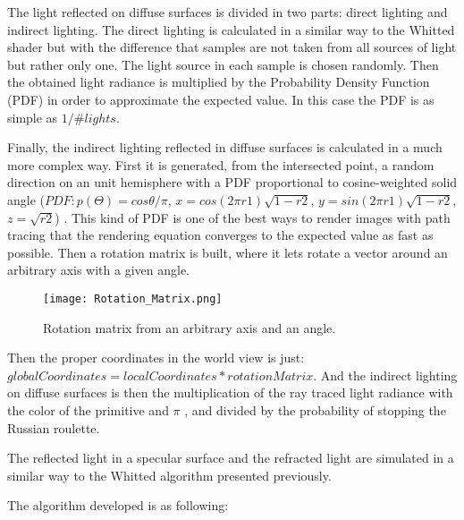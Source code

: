 \par
The light reflected on diffuse surfaces is divided in two parts: direct lighting and indirect lighting.
The direct lighting is calculated in a similar way to the Whitted shader but with the difference that samples are not taken from all sources of light but rather only one.
The light source in each sample is chosen randomly.
Then the obtained light radiance is multiplied by the Probability Density Function (PDF) in order to approximate the expected value.
In this case the PDF is as simple as
$1 / \#lights$.

\par
Finally, the indirect lighting reflected in diffuse surfaces is calculated in a much more complex way.
First it is generated, from the intersected point, a random direction on an unit hemisphere with a PDF proportional to cosine-weighted solid angle
($PDF: p(\Theta) = cos\theta / \pi$,
$x = cos(2\pi r1)\sqrt{1-r2}$,
$y = sin(2\pi r1)\sqrt{1-r2}$,
$z = \sqrt{r2}$)
.
This kind of PDF is one of the best ways to render images with path tracing that the rendering equation converges to the expected value as fast as possible.
Then a rotation matrix is built, where it lets rotate a vector around an arbitrary axis with a given angle.

\begin{figure}[H]
	\centering
	\caption{Rotation matrix from an arbitrary axis and an angle.}
	\label{Rotation_matrix.}
	\texttt{[image: Rotation\_Matrix.png]}
\end{figure}

Then the proper coordinates in the world view is just: $globalCoordinates = localCoordinates * rotationMatrix$.
And the indirect lighting on diffuse surfaces is then the multiplication of the ray traced light radiance with the color of the primitive and
$\pi$
, and divided by the probability of stopping the Russian roulette.

\par
The reflected light in a specular surface and the refracted light are simulated in a similar way to the Whitted algorithm presented previously.

\par
The algorithm developed is as following:

